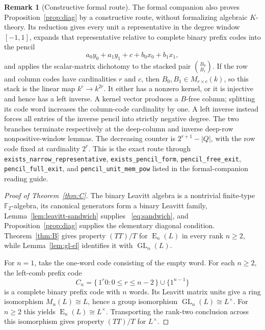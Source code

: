 \documentclass[11pt]{amsart}
\theoremstyle{definition}
\newtheorem{remark}[theorem]{Remark}
\theoremstyle{plain}
\newcommand{\F}{\mathbb F}
\newcommand{\GL}{\operatorname{GL}}
\newcommand{\EL}{\operatorname{E}}
\begin{document}
\begin{remark}[Constructive formal route]\label{rem:constructive-diagonal}
The formal companion also proves Proposition~\ref{prop:diag} by a
constructive route, without formalizing algebraic \(K\)-theory.  Its
reduction gives
every unit a representative in the degree window \([-1,1]\), expands
that representative relative to complete binary prefix codes into
the pencil
\[
 a_0y_0+a_1y_1+c+b_0x_0+b_1x_1,
\]
and applies the scalar-matrix dichotomy to the stacked pair
\(\binom{B_0}{B_1}\).  If the row and column codes have cardinalities
\(r\) and \(c\), then \(B_0,B_1\in M_{r\times c}(k)\), so this stack
is the linear map \(k^c\to k^{2r}\).  It either has a nonzero kernel,
or it is injective and hence has a left inverse.  A kernel vector
produces a \(B\)-free column;
splitting its code word increases the column-code cardinality by one.
A left inverse instead forces all entries of the inverse pencil into
strictly negative degree.  The two branches terminate respectively
at the deep-column and inverse deep-row nonpositive-window lemmas.
The decreasing counter is \(2^{r+1}-\lvert Q\rvert\), with the row
code fixed at cardinality \(2^r\).  This is the exact route through
\nolinkurl{exists_narrow_representative},
\nolinkurl{exists_pencil_form}, \nolinkurl{pencil_free_exit},
\nolinkurl{pencil_full_exit}, and \nolinkurl{pencil_unit_mem_pow}
listed in the formal-companion reading guide.
\end{remark}

\begin{proof}[Proof of Theorem~\ref{thm:C}]
The binary Leavitt algebra is a nontrivial finite-type
\(\F_2\)-algebra, its canonical generators form a binary Leavitt
family, Lemma~\ref{lem:leavitt-sandwich} supplies
~\eqref{eq:sandwich}, and
Proposition~\ref{prop:diag} supplies the elementary diagonal
condition.  Theorem~\ref{thm:B} gives property \((TT)/T\) for
\(\EL_n(L)\) in every rank \(n\ge2\), while
Lemma~\ref{lem:gl-el} identifies it with \(\GL_n(L)\).

For \(n=1\), take the one-word code consisting of the empty word.
For each \(n\ge2\), the left-comb prefix code
\[
 C_n=\{\,1^r0:0\le r\le n-2\,\}\cup\{1^{n-1}\}
\]
is a complete binary prefix code with \(n\) words.  Its Leavitt
matrix units give a ring isomorphism \(M_n(L)\cong L\), hence a group
isomorphism \(\GL_n(L)\cong L^\times\).  For \(n\ge2\) this yields
\(\EL_n(L)\cong L^\times\).  Transporting the rank-two conclusion
across this isomorphism gives property \((TT)/T\) for \(L^\times\).
\end{proof}
\end{document}
